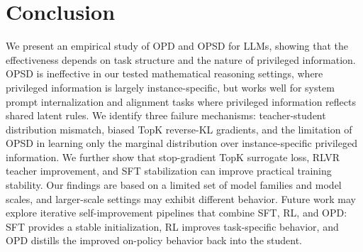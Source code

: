 \section{Conclusion}

We present an empirical study of OPD and OPSD for LLMs, showing that the effectiveness depends on task structure and the nature of privileged information. OPSD is ineffective in our tested mathematical reasoning settings, where privileged information is largely instance-specific, but works well for system prompt internalization and alignment tasks where privileged information reflects shared latent rules. We identify three failure mechanisms: teacher-student distribution mismatch, biased TopK reverse-KL gradients, and the limitation of OPSD in learning only the marginal distribution over instance-specific privileged information. We further show that stop-gradient TopK surrogate loss, RLVR teacher improvement, and SFT stabilization can improve practical training stability. Our findings are based on a limited set of model families and model scales, and larger-scale settings may exhibit different behavior. Future work may explore iterative self-improvement pipelines that combine SFT, RL, and OPD: SFT provides a stable initialization, RL improves task-specific behavior, and OPD distills the improved on-policy behavior back into the student.
